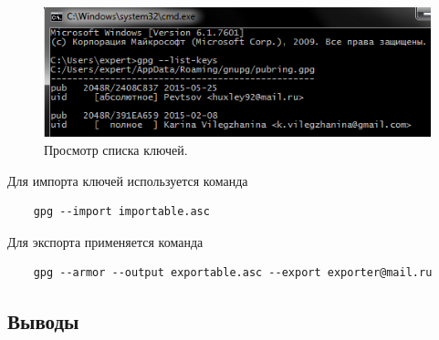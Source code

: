 \documentclass[a4paper, 14pt]{article}				%
\begin{document}
\begin{figure}[h!]
\centering
\includegraphics[width=\textwidth]{fig14}
\caption{Просмотр списка ключей.}
\end{figure}

Для импорта ключей используется команда
\begin{verbatim}
	gpg --import importable.asc
\end{verbatim}
Для экспорта применяется команда
\begin{verbatim}
	gpg --armor --output exportable.asc --export exporter@mail.ru
\end{verbatim}

\subsection{Выводы}
\end{document}
